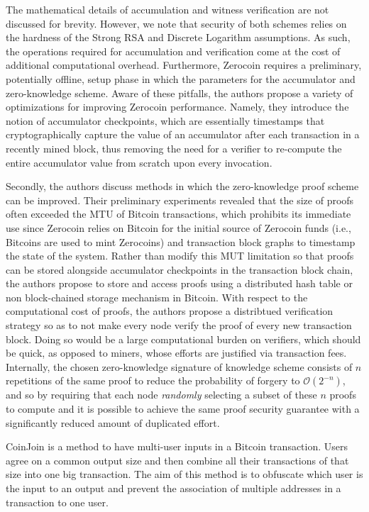 
The mathematical details of accumulation and witness verification are not discussed for brevity. However, we note that security of both schemes relies on the hardness of the Strong RSA and Discrete Logarithm assumptions. As such, the operations required for accumulation and verification come at the cost of additional computational overhead. Furthermore, Zerocoin requires a preliminary, potentially offline, setup phase in which the parameters for the accumulator and zero-knowledge scheme. Aware of these pitfalls, the authors propose a variety of optimizations for improving Zerocoin performance. Namely, they introduce the notion of accumulator checkpoints, which are essentially timestamps that cryptographically capture the value of an accumulator after each transaction in a recently mined block, thus removing the need for a verifier to re-compute the entire accumulator value from scratch upon every invocation. 

Secondly, the authors discuss methods in which the zero-knowledge proof scheme can be improved. Their preliminary experiments revealed that the size of proofs often exceeded the MTU of Bitcoin transactions, which prohibits its immediate use since Zerocoin relies on Bitcoin for the initial source of Zerocoin funds (i.e., Bitcoins are used to mint Zerocoins) and transaction block graphs to timestamp the state of the system. Rather than modify this MUT limitation so that proofs can be stored alongside accumulator checkpoints in the transaction block chain, the authors propose to store and access proofs using a distributed hash table or non block-chained storage mechanism in Bitcoin. With respect to the computational cost of proofs, the authors propose a distribtued verification strategy so as to not make every node verify the proof of every new transaction block. Doing so would be a large computational burden on verifiers, which should be quick, as opposed to miners, whose efforts are justified via transaction fees. Internally, the chosen zero-knowledge signature of knowledge scheme consists of $n$ repetitions of the same proof to reduce the probability of forgery to $\mathcal{O}(2^{-n})$, and so by requiring that each node \emph{randomly} selecting a subset of these $n$ proofs to compute and it is possible to achieve the same proof security guarantee with a significantly reduced amount of duplicated effort.

CoinJoin \cite{coinjoin} is a method to have multi-user inputs in a Bitcoin transaction. Users agree on a common output size and then combine all their transactions of that size into one big transaction. The aim of this method is to obfuscate which user is the input to an output and prevent the association of multiple addresses in a transaction to one user.

